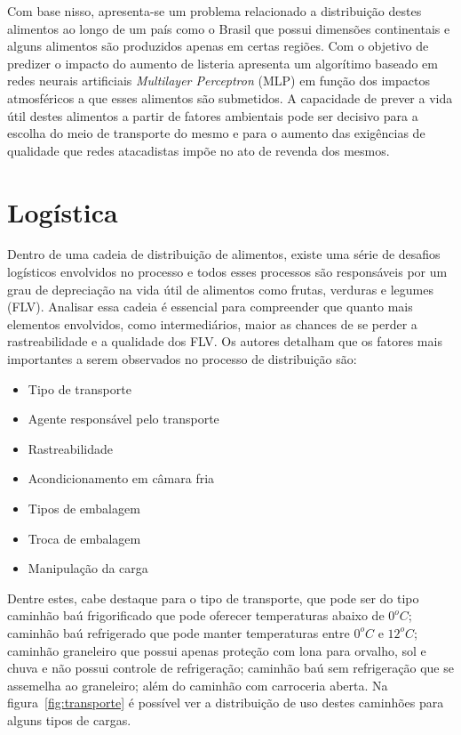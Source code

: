 Com base nisso, apresenta-se um problema relacionado a distribuição destes alimentos ao longo de um país como o Brasil que possui dimensões continentais e alguns alimentos são produzidos apenas em certas regiões.
Com o objetivo de predizer o impacto do aumento de listeria  apresenta um algorítimo baseado em redes neurais artificiais \textit{Multilayer Perceptron} (MLP) em função dos impactos atmosféricos a que esses alimentos são submetidos. A capacidade de prever a vida útil destes alimentos a partir de fatores ambientais pode ser decisivo para a escolha do meio de transporte do mesmo e para o aumento das exigências de qualidade que redes atacadistas impõe no ato de revenda dos mesmos.

\section{Logística}
Dentro de uma cadeia de distribuição de alimentos, existe uma série de desafios logísticos envolvidos no processo e todos esses processos são responsáveis por um grau de depreciação na vida útil de alimentos como frutas, verduras e legumes (FLV). Analisar essa cadeia é essencial para compreender que quanto mais elementos envolvidos, como intermediários, maior as chances de se perder a rastreabilidade e a qualidade dos FLV.
Os autores  detalham que os fatores mais importantes a serem observados no processo de distribuição são:
\begin{itemize}
    \item Tipo de transporte
    \item Agente responsável pelo transporte
    \item Rastreabilidade
    \item Acondicionamento em câmara fria
    \item Tipos de embalagem
    \item Troca de embalagem
    \item Manipulação da carga
\end{itemize}

Dentre estes, cabe destaque para o tipo de transporte, que pode ser do tipo caminhão baú frigorificado que pode oferecer temperaturas abaixo de $0^oC$; caminhão baú refrigerado que pode manter temperaturas entre $0^oC$ e $12^oC$; caminhão graneleiro que possui apenas proteção com lona para orvalho, sol e chuva e não possui controle de refrigeração; caminhão baú sem refrigeração que se assemelha ao graneleiro; além do caminhão com carroceria aberta. Na figura~\ref{fig:transporte} é possível ver a distribuição de uso destes caminhões para alguns tipos de cargas.

